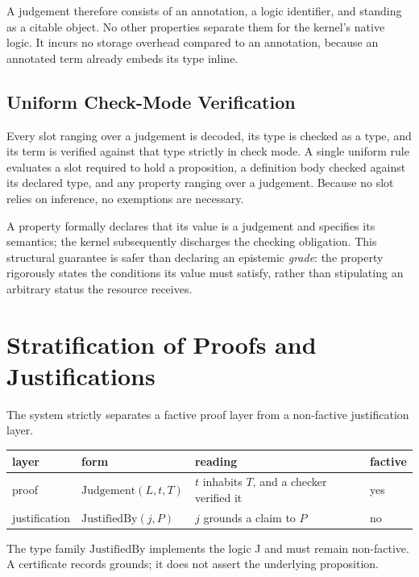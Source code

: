 \documentclass[manuscript,nonacm=true]{acmart}
\begin{document}
A judgement therefore consists of an annotation, a logic identifier, and standing as a citable object. No other properties separate them for the kernel's native logic. It incurs no storage overhead compared to an annotation, because an annotated term already embeds its type inline.

\subsection{Uniform Check-Mode Verification}

Every slot ranging over a judgement is decoded, its type is checked as a type, and its term is verified against that type strictly in check mode. A single uniform rule evaluates a slot required to hold a proposition, a definition body checked against its declared type, and any property ranging over a judgement. Because no slot relies on inference, no exemptions are necessary.

A property formally declares that its value is a judgement and specifies its semantics; the kernel subsequently discharges the checking obligation. This structural guarantee is safer than declaring an epistemic \emph{grade}: the property rigorously states the conditions its value must satisfy, rather than stipulating an arbitrary status the resource receives.

\section{Stratification of Proofs and Justifications}

The system strictly separates a factive proof layer from a non-factive justification layer.

\begin{table}[h]
\small
\begin{tabular}{@{}llll@{}}
\toprule
\textbf{layer} & \textbf{form} & \textbf{reading} & \textbf{factive} \\
\midrule
proof & $\mathrm{Judgement}(L, t, T)$ & $t$ inhabits $T$, and a checker verified it & yes \\
justification & $\mathrm{JustifiedBy}(j, P)$ & $j$ grounds a claim to $P$ & no \\
\bottomrule
\end{tabular}
\end{table}

The type family $\mathrm{JustifiedBy}$ implements the logic J and must remain non-factive. A certificate records grounds; it does not assert the underlying proposition.
\end{document}
